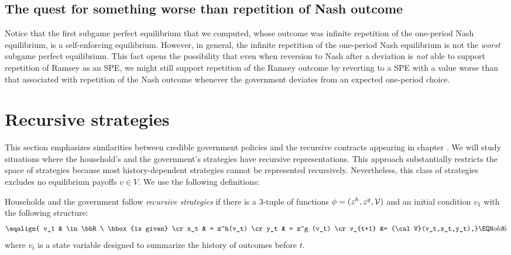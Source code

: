 \subsection{The quest for something worse than repetition of Nash outcome}
Notice that the first subgame perfect equilibrium that we computed,
whose outcome was infinite repetition of the one-period Nash
equilibrium, is a self-enforcing equilibrium.  However, in general,
the infinite repetition of the one-period Nash equilibrium is not
the {\it worst\/} subgame perfect equilibrium.
This fact opens  the possibility that even when reversion
to Nash after a deviation is {\it not\/} able to support repetition
of Ramsey as an SPE, we might still
support repetition of the Ramsey
outcome by reverting to a SPE with
a value worse than that associated with repetition of the
 Nash outcome whenever the government deviates from an expected one-period choice.




\section{Recursive strategies}
This section emphasizes similarities between
credible government policies and the recursive
contracts appearing in chapter .
We will study situations where
 the household's and the  government's strategies  have  recursive representations.
   This
approach substantially restricts the space of strategies
because most history-dependent strategies cannot be
represented recursively. Nevertheless, this class of
strategies excludes no equilibrium payoffs $v\in V$.
We use the following definitions:

\medskip{} Households and the
government follow {\it recursive strategies}
if there is a 3-tuple of functions
$\phi = (z^h,z^g, {\cal V})$ and an initial
condition $v_1$ with the following structure:
$$\eqalign{ v_1 & \in \bbR \  \hbox{is given} \cr
  x_t & = z^h(v_t)              \cr
  y_t & = z^g (v_t)  \cr
   v_{t+1} &= {\cal V}(v_t,x_t,y_t),} \EQN old6 $$
where $v_t$ is a
state variable designed to summarize the history of
outcomes before $t$.


